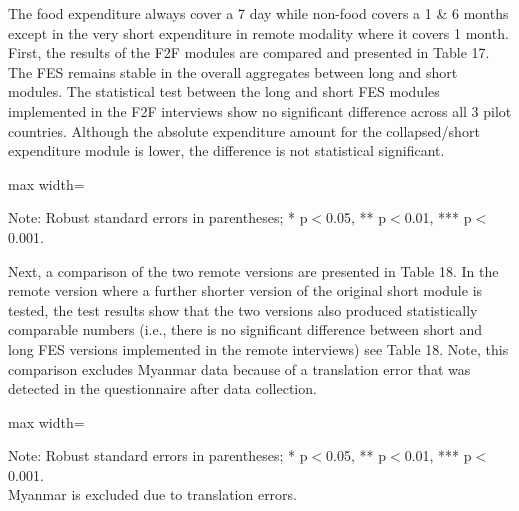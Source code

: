 \documentclass[11pt,harvard]{article}
\begin{document}
The food expenditure always cover a 7 day while non-food covers a 1 \& 6 months except in the very short expenditure in remote modality where it covers 1 month. First, the results of the F2F modules are compared and presented in Table 17. The FES remains stable in the overall aggregates between long and short modules. The statistical test between the long and short FES modules implemented in the F2F interviews show no significant difference across all 3 pilot countries. Although the absolute expenditure amount for the collapsed/short expenditure module is lower, the difference is not statistical significant. 

\begin{table}[htbp]
	\centering
	\begin{adjustbox}{max width=\textwidth}
		\begin{threeparttable}
			\caption{Impact of Module Length on Expenditure and FES in F2F Surveys}
			\scriptsize
			 
			\label{tab:FES_F2F_Form_Length_All_Country}
			\begin{tablenotes}
				\item Note: Robust standard errors in parentheses; * p$<$0.05, ** p$<$0.01, *** p$<$0.001. 
			\end{tablenotes}
		\end{threeparttable}
	\end{adjustbox}
\end{table}

Next, a comparison of the two remote versions are presented in Table 18. In the remote version where a further shorter version of the original short module is tested, the test results show that the two versions also produced statistically comparable numbers (i.e., there is no significant difference between short and long FES versions implemented in the remote interviews) see Table 18. Note, this comparison excludes Myanmar data because of a translation error that was detected in the questionnaire after data collection.

\begin{table}[htbp]
	\centering
	\begin{adjustbox}{max width=\textwidth}
		\begin{threeparttable}
			\caption{Impact of Module Length on Expenditure and FES in Remote Surveys}
			\scriptsize
			 
			\label{tab:FES_RM_Form_Length_ECU_CAR}
			\begin{tablenotes}
				\item Note: Robust standard errors in parentheses; * p$<$0.05, ** p$<$0.01, *** p$<$0.001. \\
						 Myanmar is excluded due to translation errors.
			\end{tablenotes}
		\end{threeparttable}
	\end{adjustbox}
\end{table}
\end{document}
